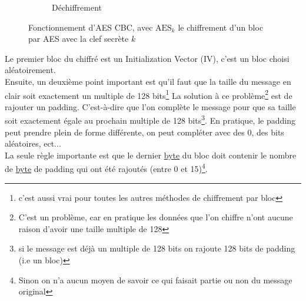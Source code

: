 \documentclass[a4paper, 12pt]{article}
\begin{document}
\begin{figure}[h]
\begin{subfigure}{\textwidth}
\caption{Déchiffrement}
\end{subfigure}
\caption{Fonctionnement d'AES CBC, avec $\text{AES}_k$ le chiffrement d'un bloc par AES avec la clef secrète $k$}
\label{ilu_cbc}
\end{figure}

Le premier bloc du chiffré est un Initialization Vector (IV), c'est un bloc choisi aléatoirement. \\
Ensuite, un deuxième point important est qu'il faut que la taille du message en clair soit exactement un multiple de 128 bits\footnote{c'est aussi vrai pour toutes les autres méthodes de chiffrement par bloc} La solution à ce problème\footnote{C'est un problème, car en pratique les données que l'on chiffre n'ont aucune raison d'avoir une taille multiple de 128} est de rajouter un padding. C'est-à-dire que l'on complète le message pour que sa taille soit exactement égale au prochain multiple de 128 bits\footnote{si le message est déjà un multiple de 128 bits on rajoute 128 bits de padding (i.e un bloc)}. 
En pratique, le padding peut prendre plein de forme différente, on peut compléter avec des $0$, des bits aléatoires, ect...\\ La seule règle importante est que le dernier \hyperref[byte]{byte} du bloc doit contenir le nombre de \hyperref[byte]{byte} de padding qui ont été rajoutés (entre 0 et 15)\footnote{Sinon on n'a aucun moyen de savoir ce qui faisait partie ou non du message original}. \\
\end{document}
